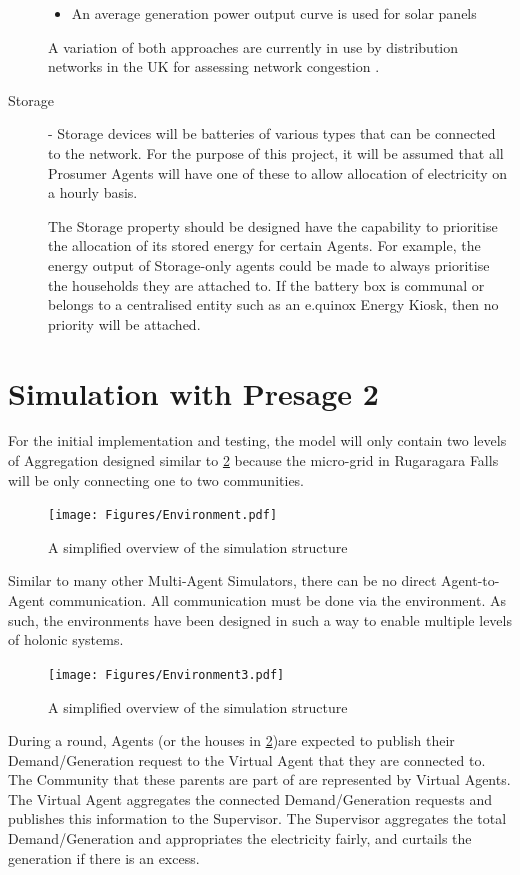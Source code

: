 \begin{description}
\begin{itemize}
  \item An average generation power output curve is used for solar panels

\end{itemize}

A variation of both approaches are currently in use by distribution networks in the UK for assessing network congestion \cite{IPSA-web-constraint:2015}. \

\item[Storage] - Storage devices will be batteries of various types that can be connected to the network. For the purpose of this project, it will be assumed that all Prosumer Agents will have one of these to allow allocation of electricity on a hourly basis.

The Storage property should be designed have the capability to prioritise the allocation of its stored energy for certain Agents. For example, the energy output of Storage-only agents could be made to always prioritise the households they are attached to. If the battery box is communal or belongs to a centralised entity such as an e.quinox Energy Kiosk, then no priority will be attached.
\end{description}
\section*{Simulation with Presage 2}
For the initial implementation and testing, the model will only contain two levels of Aggregation designed similar to \ref{fig:SimEnv} because the micro-grid in Rugaragara Falls will be only connecting one to two communities. 

\begin{figure}[h!]
	\centering
	\texttt{[image: Figures/Environment.pdf]}
	\caption{A simplified overview of the simulation structure}
	\label{fig:SimEnv}
\end{figure}

Similar to many other Multi-Agent Simulators, there can be no direct Agent-to-Agent communication. All communication must be done via the environment. As such, the environments have been designed in such a way to enable multiple levels of holonic systems.

\begin{figure}[h!]
	\centering
	\texttt{[image: Figures/Environment3.pdf]}
	\caption{A simplified overview of the simulation structure}
	\label{fig:SimEnv}
\end{figure}

\clearpage
During a round, Agents (or the houses in \ref{fig:SimEnv})are expected to publish their Demand/Generation request to the Virtual Agent that they are connected to. The Community that these parents are part of are represented by Virtual Agents. The Virtual Agent aggregates the connected Demand/Generation requests and publishes this information to the Supervisor. The Supervisor aggregates the total Demand/Generation and appropriates the electricity fairly, and curtails the generation if there is an excess.

